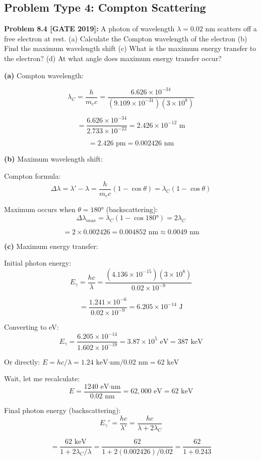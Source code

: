 \documentclass[12pt,a4paper]{article}
\begin{document}
\subsection{Problem Type 4: Compton Scattering}

\textbf{Problem 8.4 [GATE 2019]:} A photon of wavelength $\lambda = 0.02$ nm scatters off a free electron at rest.
(a) Calculate the Compton wavelength of the electron
(b) Find the maximum wavelength shift
(c) What is the maximum energy transfer to the electron?
(d) At what angle does maximum energy transfer occur?

\begin{solution}
\textbf{(a)} Compton wavelength:

$$\lambda_C = \frac{h}{m_e c} = \frac{6.626 \times 10^{-34}}{(9.109 \times 10^{-31})(3 \times 10^8)}$$

$$= \frac{6.626 \times 10^{-34}}{2.733 \times 10^{-22}} = 2.426 \times 10^{-12}\text{ m}$$

$$= 2.426\text{ pm} = 0.002426\text{ nm}$$

\textbf{(b)} Maximum wavelength shift:

Compton formula:
$$\Delta\lambda = \lambda' - \lambda = \frac{h}{m_e c}(1 - \cos\theta) = \lambda_C(1 - \cos\theta)$$

Maximum occurs when $\theta = 180°$ (backscattering):
$$\Delta\lambda_{max} = \lambda_C(1 - \cos 180°) = 2\lambda_C$$

$$= 2 \times 0.002426 = 0.004852\text{ nm} \approx 0.0049\text{ nm}$$

\textbf{(c)} Maximum energy transfer:

Initial photon energy:
$$E_{\gamma} = \frac{hc}{\lambda} = \frac{(4.136 \times 10^{-15})(3 \times 10^8)}{0.02 \times 10^{-9}}$$

$$= \frac{1.241 \times 10^{-6}}{0.02 \times 10^{-9}} = 6.205 \times 10^{-14}\text{ J}$$

Converting to eV:
$$E_{\gamma} = \frac{6.205 \times 10^{-14}}{1.602 \times 10^{-19}} = 3.87 \times 10^{5}\text{ eV} = 387\text{ keV}$$

Or directly: $E = hc/\lambda = 1.24\text{ keV·nm}/0.02\text{ nm} = 62\text{ keV}$

Wait, let me recalculate:
$$E = \frac{1240\text{ eV·nm}}{0.02\text{ nm}} = 62,000\text{ eV} = 62\text{ keV}$$

Final photon energy (backscattering):
$$E_{\gamma}' = \frac{hc}{\lambda'} = \frac{hc}{\lambda + 2\lambda_C}$$

$$= \frac{62\text{ keV}}{1 + 2\lambda_C/\lambda} = \frac{62}{1 + 2(0.002426)/0.02} = \frac{62}{1 + 0.243}$$


\end{solution}
\end{document}
